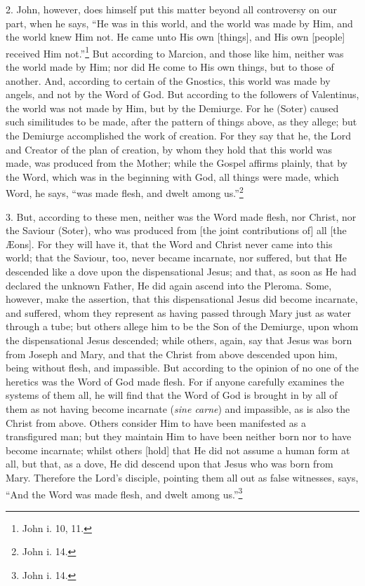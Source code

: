 2. John, however, does himself put this matter beyond all controversy on our part, when he says, “He was in this world, and the world was made by Him, and the world knew Him not. He came unto His own [things], and His own [people] received Him not.”\footnote{John i. 10, 11.} But according to Marcion, and those like him, neither was the world made by Him; nor did He come to His own things, but to those of another. And, according to certain of the Gnostics, this world was made by angels, and not by the Word of God. But according to the followers of Valentinus, the world was not made by Him, but by the Demiurge. For he (Soter) caused such similitudes to be made, after the pattern of things above, as they allege; but the Demiurge accomplished the work of creation. For they say that he, the Lord and Creator of the plan of creation, by whom they hold that this world was made, was produced from the Mother; while the Gospel affirms plainly, that by the Word, which was in the beginning with God, all things were made, which Word, he says, “was made flesh, and dwelt among us.”\footnote{John i. 14.}

3. But, according to these men, neither was the Word made flesh, nor Christ, nor the Saviour (Soter), who was produced from [the joint contributions  of] all [the Æons]. For they will have it, that the Word and Christ never came into this world; that the Saviour, too, never became incarnate, nor suffered, but that He descended like a dove upon the dispensational Jesus; and that, as soon as He had declared the unknown Father, He did again ascend into the Pleroma. Some, however, make the assertion, that this dispensational Jesus did become incarnate, and suffered, whom they represent as having passed through Mary just as water through a tube; but others allege him to be the Son of the Demiurge, upon whom the dispensational Jesus descended; while others, again, say that Jesus was born from Joseph and Mary, and that the Christ from above descended upon him, being without flesh, and impassible. But according to the opinion of no one of the heretics was the Word of God made flesh. For if anyone carefully examines the systems of them all, he will find that the Word of God is brought in by all of them as not having become incarnate (\emph{sine carne}) and impassible, as is also the Christ from above. Others consider Him to have been manifested as a transfigured man; but they maintain Him to have been neither born nor to have become incarnate; whilst others [hold] that He did not assume a human form at all, but that, as a dove, He did descend upon that Jesus who was born from Mary. Therefore the Lord’s disciple, pointing them all out as false witnesses, says, “And the Word was made flesh, and dwelt among us.”\footnote{John i. 14.}

